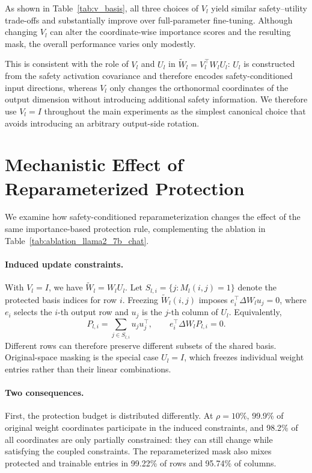 \documentclass{article}
\newcommand{\kms}[1]{{\leavevmode\color{blue}[MS: #1]}}
\begin{document}
As shown in Table~\ref{tab:v_basis}, all three choices of $V_l$ yield similar safety--utility trade-offs and substantially improve over full-parameter fine-tuning. Although changing $V_l$ can alter the coordinate-wise importance scores and the resulting mask, the overall performance varies only modestly.

This is consistent with the role of $V_l$ and $U_l$ in
$\widetilde W_l = V_l^\top W_l U_l$: $U_l$ is constructed from the safety activation covariance and therefore encodes safety-conditioned input directions, whereas $V_l$ only changes the orthonormal coordinates of the output dimension without introducing additional safety information. We therefore use $V_l=I$ throughout the main experiments as the simplest canonical choice that avoids introducing an arbitrary output-side rotation.






\section{Mechanistic Effect of Reparameterized Protection}
\label{app:reparam_analysis}
We examine how safety-conditioned reparameterization changes the effect of the same importance-based protection rule, complementing the ablation in Table~\ref{tab:ablation_llama2_7b_chat}.

\paragraph{Induced update constraints.} With $V_l=I$, we have $\widetilde W_l=W_lU_l$. Let $S_{l,i}=\{j:M_l(i,j)=1\}$ denote the protected basis indices for row $i$. Freezing $\widetilde W_l(i,j)$ imposes $e_i^\top\Delta W_lu_j=0$, where $e_i$ selects the $i$-th output row and $u_j$ is the $j$-th column of $U_l$. Equivalently, 
\begin{equation}
    P_{l,i}=\sum_{j\in S_{l,i}}u_ju_j^\top,
    \qquad
    e_i^\top\Delta W_lP_{l,i}=0.
\end{equation}
Different rows can therefore preserve different subsets of the shared basis. Original-space masking is the special case $U_l=I$, which freezes individual weight entries rather than their linear combinations.

\paragraph{Two consequences.}
First, the protection budget is distributed differently. At $\rho=10\%$, 99.9\% of original weight coordinates participate in the induced constraints, and 98.2\% of all coordinates are only partially constrained: they can still change while satisfying the coupled constraints. The reparameterized mask also mixes protected and trainable entries in 99.22\% of rows and 95.74\% of columns.
\end{document}

